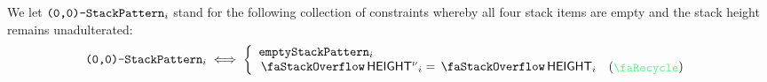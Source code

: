 We let $\texttt{(0,0)-}\texttt{StackPattern}_{i}$ stand for the following collection of constraints whereby all four stack items are empty and the stack height remains unadulterated:
\[
	\zeroZeroSP_{i}
	\iff
	\left\{
	\begin{array}{lc}
		\emptySP_{i}                                  \\
		\stackHeight{}\new{}_{i} = \stackHeight{}_{i} & (\sanityCheck) \\
	\end{array}
	\right.
\]
